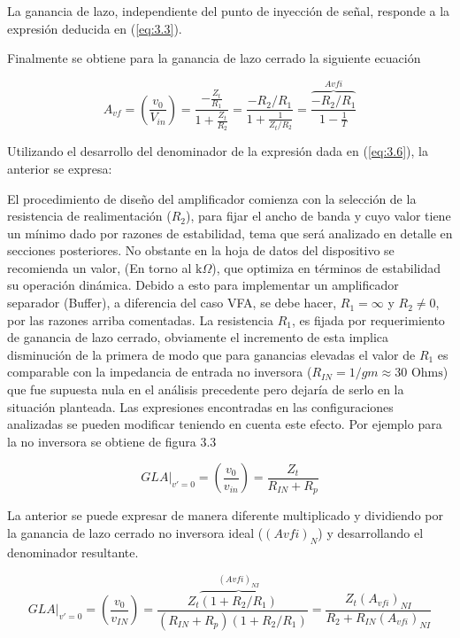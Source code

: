 La ganancia de lazo, independiente del punto de inyección de señal, responde a la expresión deducida en (\ref{eq:3.3}).

Finalmente se obtiene para la ganancia de lazo cerrado la siguiente ecuación

\begin{equation}
A_{vf} = \left( \frac{v_0}{V_{in}} \right) = \frac{- \frac{Z_t}{R_1}}{1 + \frac{Z_t}{R_2}} = \frac{- R_2 / R_1}{1 + \frac{1}{Z_t / R_2}} = \frac{\overbrace{- R_2 / R_1}^{Avfi}}{1 - \frac{1}{T}}
\label{eq:3.9}
\end{equation}

Utilizando el desarrollo del denominador de la expresión dada en (\ref{eq:3.6}), la anterior se expresa:

El procedimiento de diseño del amplificador comienza con la selección de la resistencia de realimentación ($R_2$), para fijar el ancho de banda y cuyo valor tiene un mínimo dado por razones de estabilidad, tema que será analizado en detalle en secciones posteriores. No obstante en la hoja de datos del dispositivo se recomienda un valor, (En torno al $\text{k}\Omega$), que optimiza en términos de estabilidad su operación dinámica. Debido a esto para implementar un amplificador separador (Buffer), a diferencia del caso VFA, se debe hacer, $R_1= \infty$ y $R_2 \neq 0$, por las razones arriba comentadas.
La resistencia $R_1$, es fijada por requerimiento de ganancia de lazo cerrado, obviamente el incremento de esta implica disminución de la primera de modo que para ganancias elevadas el valor de $R_1$ es comparable con la impedancia de entrada no inversora ($R_{IN} = 1/gm \approx 30 \text{ Ohms}$) que fue supuesta nula en el análisis precedente pero dejaría de serlo en la situación planteada. Las expresiones encontradas en las configuraciones analizadas se pueden modificar teniendo en cuenta este efecto. Por ejemplo para la no inversora se obtiene de figura 3.3

\begin{equation}
GLA|_{v'=0} = \left( \frac{v_0}{v_{in}} \right) = \frac{Z_t}{R_{IN} + R_p}
\label{eq:3.10}
\end{equation}

La anterior se puede expresar de manera diferente multiplicado y dividiendo por la ganancia de lazo cerrado no inversora ideal ($(Avfi)_N$) y desarrollando el denominador resultante.

$$
GLA|_{v'=0} = \left( \frac{v_0}{v_{IN}} \right) = \frac{Z_t \overbrace{(1 + R_2 / R_1)}^{(Avfi)_{NI}}}{(R_{IN} + R_p)(1 + R_2 / R_1)} = \frac{Z_t (A_{vfi})_{NI}}{R_2 + R_{IN} (A_{vfi})_{NI}}
$$


